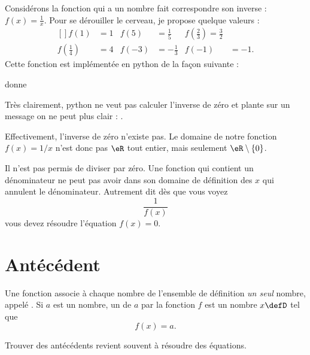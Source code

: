 \begin{example}
    Considérons la fonction qui a un nombre fait correspondre son inverse : \( f(x)=\frac{1}{ x }\). Pour se dérouiller le cerveau, je propose quelque valeurs :
    \begin{equation}
        \begin{aligned}[]
            f(1)&=1&f(5)&=\frac{1}{ 5 }&f(\frac{ 2 }{ 3 })=\frac{ 3 }{ 2 }\\
            f(\frac{ 1 }{ 4 })&=4&f(-3)&=-\frac{1}{ 3 }&f(-1)&=-1.
        \end{aligned}
    \end{equation}
    Cette fonction est implémentée en python de la façon suivante :



donne



Très clairement, python ne veut pas calculer l'inverse de zéro et plante sur un message on ne peut plus clair : .

Effectivement, l'inverse de zéro n'existe pas. Le domaine de notre fonction \( f(x)=1/x\) n'est donc pas \( \eR\) tout entier, mais seulement \( \eR\setminus\{ 0 \}\).

\end{example}

\begin{Aretenir}        \label{ArtJgipNt}
    Il n'est pas permis de diviser par zéro. Une fonction qui contient un dénominateur ne peut pas avoir dans son domaine de définition des \( x\) qui annulent le dénominateur. Autrement dit dès que vous voyez
    \begin{equation}
        \frac{1}{ f(x) }
    \end{equation}
    vous devez résoudre l'équation \( f(x)=0\).
\end{Aretenir}

\section{Antécédent}

\begin{Aretenir}
Une fonction associe à chaque nombre de l'ensemble de définition \emph{un seul} nombre, appelé . Si \( a\) est un nombre, un  de \( a\) par la fonction \( f\) est un nombre \( x\defD\) tel que 
\begin{equation}
    f(x)=a.
\end{equation}
\end{Aretenir}
Trouver des antécédents revient souvent à résoudre des équations.

